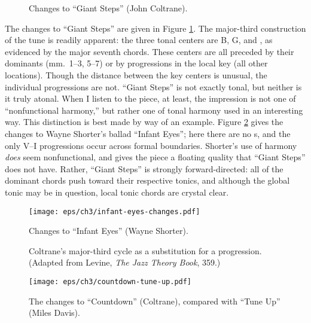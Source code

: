\begin{figure}[tbp]
  \caption{Changes to ``Giant Steps'' (John Coltrane).}
  \label{maj3:giant-steps-changes}
\end{figure}

The changes to ``Giant Steps'' are given in Figure
\ref{maj3:giant-steps-changes}. The major-third construction of the tune is
readily apparent: the three tonal centers are B, G, and \Eflat, as evidenced
by the major seventh chords. These centers are all preceded by their dominants
(mm.~1--3, 5--7) or by \tf progressions in the local key (all other
locations). Though the distance between the key centers is unusual, the
individual progressions are not. ``Giant Steps'' is not exactly
tonal, but neither is it truly atonal. When I listen to the piece, at least,
the impression is not one of ``nonfunctional harmony,'' but rather one of
tonal harmony used in an interesting way. This distinction is best made by way
of an example. Figure \ref{maj3:infant-eyes-changes} gives the changes to
Wayne Shorter's ballad ``Infant Eyes''; here there are no \tf{}s, and the only
V--I progressions occur across formal boundaries. Shorter's use of harmony
\emph{does} seem nonfunctional, and gives the piece a floating quality that
``Giant Steps'' does not have. Rather, ``Giant Steps'' is strongly
forward-directed: all of the dominant chords push toward their respective
tonics, and although the global tonic may be in question, local tonic chords
are crystal clear.

\begin{figure}[tbp]
  \hspace{6em}\texttt{[image: eps/ch3/infant-eyes-changes.pdf]}
  \caption{Changes to ``Infant Eyes'' (Wayne Shorter).}
  \label{maj3:infant-eyes-changes}
\end{figure}

\begin{figure}[tbp]
  \caption[Coltrane's major-third cycle as a substitution for a \tfo
    progression.]{Coltrane's major-third cycle as a substitution for a \tfo
    progression. (Adapted from Levine, \emph{The Jazz Theory Book}, 359.)}
  \label{maj3:coltrane-substitution}
\end{figure}

\begin{figure}[tbp]
  \hspace{1em}\texttt{[image: eps/ch3/countdown-tune-up.pdf]}
  \caption{The changes to ``Countdown'' (Coltrane), compared with
    ``Tune Up'' (Miles Davis).}
  \label{maj3:countdown-tune-up}
\end{figure}

